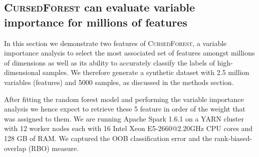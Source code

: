 \documentclass[10pt,letterpaper]{article}
\newcommand{\cursedforest}{\textsc{CursedForest}\xspace}
\newcommand{\mtry}{\texttt{mtry}\xspace}
\let\oldmarginpar\marginpar
\renewcommand\marginpar[1]{\-\oldmarginpar[\raggedleft\footnotesize #1]%
{\raggedright\footnotesize #1}}
\begin{document}
\subsection{\cursedforest can evaluate variable importance for millions of features}
\label{section:synthetic}
In this section we demonstrate two features of \cursedforest, a variable importance analysis to select the most
associated set of features amongst millions of dimensions as well as its ability to accurately classify the labels of
high-dimensional samples.  We therefore generate a synthetic dataset with 2.5 million variables (features) and 5000
samples, as discussed in the methods section.

After fitting the random forest model and performing the variable importance analysis we hence expect to retrieve these
5 feature in order of the weight that was assigned to them.  We are running Apache Spark 1.6.1 on a YARN cluster with 12
worker nodes each with 16 Intel Xeon E5-2660@2.20GHz CPU cores and 128 GB of RAM.  We captured the OOB 
classification error and the rank-biased-overlap (RBO) \cite{Webber2010} measure.



\end{document}
